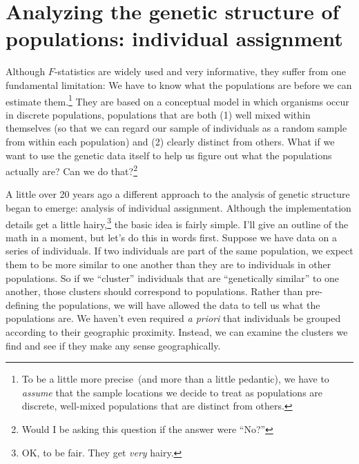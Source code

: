 \chapter{Analyzing the genetic structure of populations: individual assignment}

Although $F$-statistics are widely used and very informative, they
suffer from one fundamental limitation: We have to know what the
populations are before we can estimate them.\footnote{To be a little
  more precise~(and more than a little pedantic), we have to {\it
    assume\/} that the sample locations we decide to treat as
  populations are discrete, well-mixed populations that are distinct
  from others.} They are based on a conceptual model in which
organisms occur in discrete populations, populations that are both (1)
well mixed within themselves (so that we can regard our sample of
individuals as a random sample from within each population) and (2)
clearly distinct from others. What if we want to use the genetic data
itself to help us figure out what the populations actually are? Can we
do that?\footnote{Would I be asking this question if the answer were
  ``No?''}

A little over 20 years ago a different approach to the analysis of
genetic structure began to emerge: analysis of individual
assignment. Although the implementation
details get a little hairy,\footnote{OK, to be fair. They get {\it
    very\/} hairy.} the basic idea is fairly simple. I'll give an
outline of the math in a moment, but let's do this in words
first. Suppose we have data on a series of individuals. If two
individuals are part of the same population, we expect them to be more
similar to one another than they are to individuals in other
populations. So if we ``cluster'' individuals that are ``genetically
similar'' to one another, those clusters should correspond to
populations. Rather than pre-defining the populations, we will have
allowed the data to tell us what the populations are. We haven't even
required {\it a priori\/} that individuals be grouped according to
their geographic proximity. Instead, we can examine the clusters we
find and see if they make any sense geographically.

